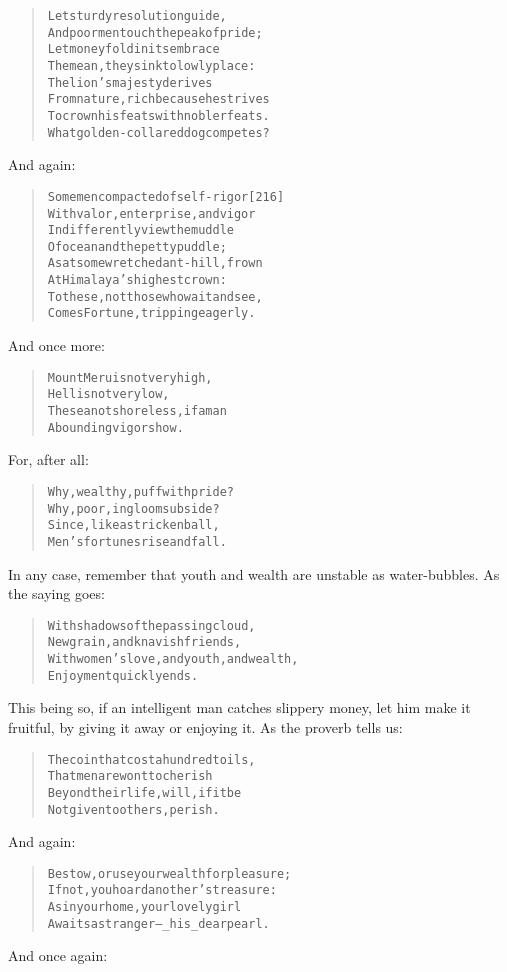 \documentclass[article, twoside, 14pt]{memoir}
\renewenvironment{verbatim}{%
\begin{quote}%
\vskip -10pt%
\begin{alltt}\normalfont\large}{\end{alltt}%
\end{quote}%
\vskip -10pt
} %
\begin{document}
\begin{verbatim}
Let sturdy resolution guide,
And poor men touch the peak of pride;
Let money fold in its embrace
The mean, they sink to lowly place:
The lion's majesty derives
From nature, rich because he strives
To crown his feats with nobler feats.
What golden-collared dog competes?
\end{verbatim}
And again:

\begin{verbatim}
Some men compacted of self-rigor                        [216]
With valor, enterprise, and vigor
Indifferently view the muddle
Of ocean and the petty puddle;
As at some wretched ant-hill, frown
At Himalaya's highest crown:
To these, not those who wait and see,
Comes Fortune, tripping eagerly.
\end{verbatim}
And once more:

\begin{verbatim}
Mount Meru is not very high,
    Hell is not very low,
The sea not shoreless, if a man
    Abounding vigor show.
\end{verbatim}
For, after all:

\begin{verbatim}
Why, wealthy, puff with pride?
Why, poor, in gloom subside?
Since, like a stricken ball,
Men's fortunes rise and fall.
\end{verbatim}
In any case, remember that youth and wealth are unstable as
water-bubbles. As the saying goes:

\begin{verbatim}
With shadows of the passing cloud,
    New grain, and knavish friends,
With women's love, and youth, and wealth,
    Enjoyment quickly ends.
\end{verbatim}
This being so, if an intelligent man catches slippery money, let
him make it fruitful, by giving it away or enjoying it. As the
proverb tells us:

\begin{verbatim}
The coin that cost a hundred toils,
    That men are wont to cherish
Beyond their life, will, if it be
    Not given to others, perish.
\end{verbatim}
And again:

\begin{verbatim}
Bestow, or use your wealth for pleasure;
If not, you hoard another's treasure:
As in your home, your lovely girl
Awaits a stranger--_his_ dear pearl.
\end{verbatim}
And once again:
\end{document}
